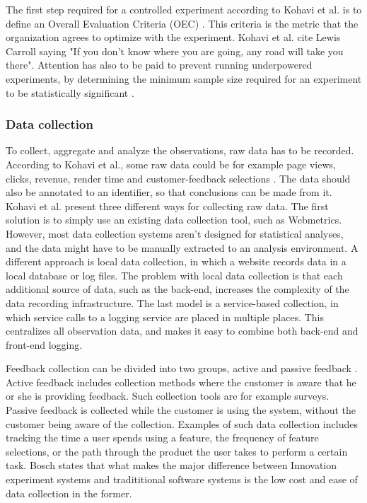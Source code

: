 \documentclass[english]{tktltiki2}
\theoremstyle{definition}
\theoremstyle{remark}
\begin{document}
The first step required for a controlled experiment according to Kohavi et al. is to define an Overall Evaluation Criteria (OEC) \cite{kohavi2009online}. This criteria is the metric that the organization agrees to optimize with the experiment. Kohavi et al. cite Lewis Carroll saying "If you don’t know where you are going, any road will take you there". Attention has also to be paid to prevent running underpowered experiments, by determining the minimum sample size required for an experiment to be statistically significant \cite{kohavi2009controlled}.

\subsubsection{Data collection}
To collect, aggregate and analyze the observations, raw data has to be recorded. According to Kohavi et al., some raw data could be for example page views, clicks, revenue, render time and customer-feedback selections \cite{kohavi2007practical}. The data should also be annotated to an identifier, so that conclusions can be made from it. Kohavi et al. present three different ways for collecting raw data. The first solution is to simply use an existing data collection tool, such as Webmetrics. However, most data collection systems aren't designed for statistical analyses, and the data might have to be manually extracted to an analysis environment. A different approach is local data collection, in which a website records data in a local database or log files. The problem with local data collection is that each additional source of data, such as the back-end, increases the complexity of the data recording infrastructure. The last model is a service-based collection, in which service calls to a logging service are placed in multiple places. This centralizes all observation data, and makes it easy to combine both back-end and front-end logging.

Feedback collection can be divided into two groups, active and passive feedback \cite{bosch2012building}. Active feedback includes collection methods where the customer is aware that he or she is providing feedback. Such collection tools are for example surveys. Passive feedback is collected while the customer is using the system, without the customer being aware of the collection. Examples of such data collection includes tracking the time a user spends using a feature, the frequency of feature selections, or the path through the product the user takes to perform a certain task. Bosch states that what makes the major difference between Innovation experiment systems and tradititional software systems is the low cost and ease of data collection in the former. 
\end{document}
